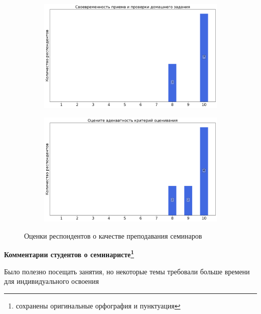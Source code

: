\begin{figure}[H]
\begin{subfigure}[b]{0.45\textwidth}
			\end{subfigure}
			\begin{subfigure}[b]{0.45\textwidth}
				\centering
				\includegraphics[width=\textwidth]{images/2 course/Дифференциальные уравнения/seminarists-marks-Барабанщиков А.В.-2.png}
			\end{subfigure}
			\begin{subfigure}[b]{0.45\textwidth}
				\centering
				\includegraphics[width=\textwidth]{images/2 course/Дифференциальные уравнения/seminarists-marks-Барабанщиков А.В.-3.png}
			\end{subfigure}	
			\caption{Оценки респондентов о качестве преподавания семинаров}
		\end{figure}

		\textbf{Комментарии студентов о семинаристе\protect\footnote{сохранены оригинальные орфография и пунктуация}}
            \begin{commentbox} 
                Было полезно посещать занятия, но некоторые темы требовали больше времени для индивидуального освоения 
            \end{commentbox} 
        
